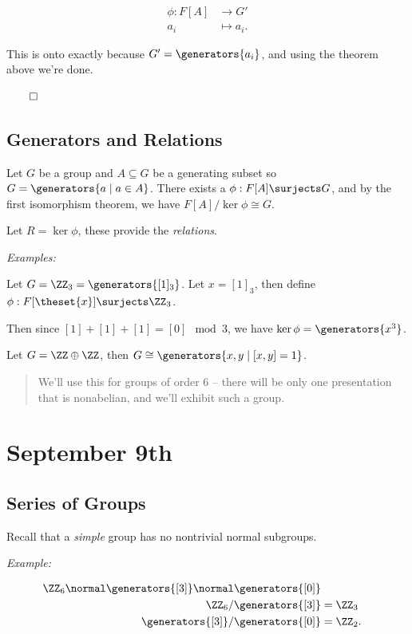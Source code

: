 \begin{align*}
\phi: F[A] &\to G' \\
a_i &\mapsto a_i
.\end{align*}

This is onto exactly because \(G' = \generators{a_i}\), and using the
theorem above we're done.

\(\qed\)

\hypertarget{generators-and-relations}{%
\subsection{Generators and Relations}\label{generators-and-relations}}

Let \(G\) be a group and \(A \subseteq G\) be a generating subset so
\(G = \generators{a \mid a\in A}\). There exists a
\(\phi: F[A] \surjects G\), and by the first isomorphism theorem, we
have \(F[A] / \ker \phi \cong G\).

Let \(R = \ker \phi\), these provide the \emph{relations}.

\emph{Examples:}

Let \(G = \ZZ_3 = \generators{[1]_3}\). Let \(x = [1]_3\), then define
\(\phi: F[\theset{x}] \surjects \ZZ_3\).

Then since \([1] + [1] + [1] = [0] \mod 3\), we have
\(\ker \phi = \generators{x^3}\).

Let \(G = \ZZ \oplus \ZZ\), then
\(G \cong \generators{x,y \mid [x,y] = 1}\).

\begin{quote}
We'll use this for groups of order 6 -- there will be only one
presentation that is nonabelian, and we'll exhibit such a group.
\end{quote}

\hypertarget{september-9th}{%
\section{September 9th}\label{september-9th}}

\hypertarget{series-of-groups-1}{%
\subsection{Series of Groups}\label{series-of-groups-1}}

Recall that a \emph{simple} group has no nontrivial normal subgroups.

\emph{Example:}

\begin{align*}
\ZZ_6 \normal \generators{[3]} \normal \generators{[0]} \\
\ZZ_6 / \generators{[3]} &= \ZZ_3 \\
\generators{[3]} / \generators{[0]} &= \ZZ_2
.\end{align*}

